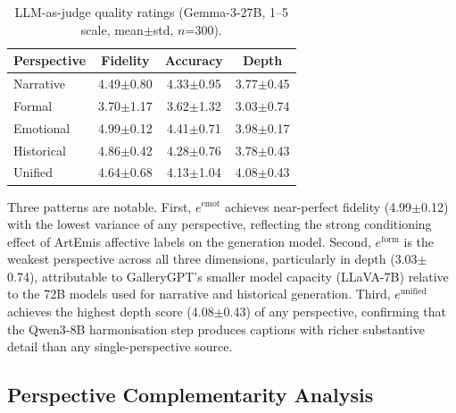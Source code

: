 \begin{table}[h]
\centering
\caption{LLM-as-judge quality ratings (Gemma-3-27B, 1--5 scale, mean$\pm$std, $n$=300).}
\label{tab:quality}
\setlength{\tabcolsep}{4pt}
\begin{tabular}{lccc}
\toprule
\textbf{Perspective} & \textbf{Fidelity} & \textbf{Accuracy} & \textbf{Depth} \\
\midrule
Narrative  & 4.49$\pm$0.80 & 4.33$\pm$0.95 & 3.77$\pm$0.45 \\
Formal     & 3.70$\pm$1.17 & 3.62$\pm$1.32 & 3.03$\pm$0.74 \\
Emotional  & 4.99$\pm$0.12 & 4.41$\pm$0.71 & 3.98$\pm$0.17 \\
Historical & 4.86$\pm$0.42 & 4.28$\pm$0.76 & 3.78$\pm$0.43 \\
Unified    & 4.64$\pm$0.68 & 4.13$\pm$1.04 & 4.08$\pm$0.43 \\
\bottomrule
\end{tabular}
\end{table}

Three patterns are notable.
First, $e^{\text{emot}}$ achieves near-perfect fidelity (4.99$\pm$0.12) with the lowest variance of any perspective, reflecting the strong conditioning effect of ArtEmis affective labels on the generation model.
Second, $e^{\text{form}}$ is the weakest perspective across all three dimensions, particularly in depth (3.03$\pm$0.74), attributable to GalleryGPT's smaller model capacity (LLaVA-7B) relative to the 72B models used for narrative and historical generation.
Third, $e^{\text{unified}}$ achieves the highest depth score (4.08$\pm$0.43) of any perspective, confirming that the Qwen3-8B harmonisation step produces captions with richer substantive detail than any single-perspective source.

\subsection{Perspective Complementarity Analysis}
\label{sec:complementarity}

